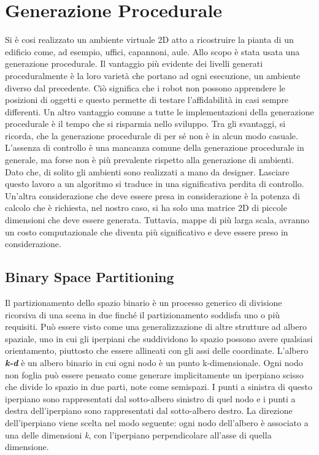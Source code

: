 \section{Generazione Procedurale}
\label{ssec:procedure}
Si è cosi realizzato un ambiente virtuale 2D atto a ricostruire
la pianta di un edificio come, ad esempio, uffici, capannoni, aule.
Allo scopo è stata usata una generazione procedurale.
Il vantaggio più evidente dei livelli generati proceduralmente è la loro varietà
che portano ad ogni esecuzione, un ambiente diverso dal precedente.
Ciò significa che i robot non possono apprendere le posizioni di oggetti e
questo permette di testare l'affidabilità in casi sempre differenti.
Un altro vantaggio comune a tutte le implementazioni della generazione
procedurale è il tempo che si risparmia nello sviluppo.
Tra gli svantaggi, si ricorda, che la generazione procedurale di per sé non è
in alcun modo casuale.
L'assenza di controllo è una mancanza comune della generazione procedurale in
generale, ma forse non è più prevalente rispetto alla generazione di ambienti.
Dato che, di solito gli ambienti sono realizzati a mano da designer.
Lasciare questo lavoro a un algoritmo si traduce in una significativa perdita di
controllo.
Un'altra considerazione che deve essere presa in considerazione è la potenza di
calcolo che è richiesta, nel nostro caso, si ha solo una matrice 2D di piccole
dimensioni che deve essere generata. Tuttavia, mappe di più larga scala, avranno
un costo computazionale che diventa più significativo e deve essere preso in
considerazione.\cite{green2016procedural}

\subsection{Binary Space Partitioning}
\label{ssec:k-d}
Il partizionamento dello spazio binario è un processo generico di divisione
ricorsiva di una scena in due finché il partizionamento soddisfa uno o più
requisiti.
Può essere visto come una generalizzazione di altre strutture ad albero spaziale,
uno in cui gli iperpiani che suddividono lo spazio possono avere qualsiasi
orientamento, piuttosto che essere allineati con gli assi delle
coordinate.\cite{wiki:bsp}
L'albero \textbf{\emph{k-d}} è un albero binario in cui ogni nodo è un punto
k-dimensionale. Ogni nodo non foglia può essere pensato come generare
implicitamente un iperpiano scisso che divide lo spazio in due parti, note come
semispazi. I punti a sinistra di questo iperpiano sono rappresentati dal
sotto-albero sinistro di quel nodo e i punti a destra dell'iperpiano sono
rappresentati dal sotto-albero destro. La direzione dell'iperpiano viene scelta
nel modo seguente: ogni nodo dell'albero è associato a una delle dimensioni
\emph{k}, con l'iperpiano perpendicolare all'asse di quella dimensione.\cite{wiki:kdtree}

